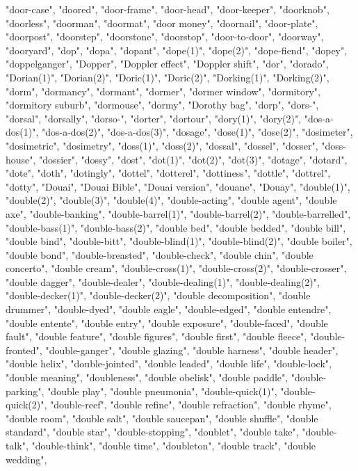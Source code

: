 "door-case",
"doored",
"door-frame",
"door-head",
"door-keeper",
"doorknob",
"doorless",
"doorman",
"doormat",
"door money",
"doornail",
"door-plate",
"doorpost",
"doorstep",
"doorstone",
"doorstop",
"door-to-door",
"doorway",
"dooryard",
"dop",
"dopa",
"dopant",
"dope(1)",
"dope(2)",
"dope-fiend",
"dopey",
"doppelganger",
"Dopper",
"Doppler effect",
"Doppler shift",
"dor",
"dorado",
"Dorian(1)",
"Dorian(2)",
"Doric(1)",
"Doric(2)",
"Dorking(1)",
"Dorking(2)",
"dorm",
"dormancy",
"dormant",
"dormer",
"dormer window",
"dormitory",
"dormitory suburb",
"dormouse",
"dormy",
"Dorothy bag",
"dorp",
"dors-",
"dorsal",
"dorsally",
"dorso-",
"dorter",
"dortour",
"dory(1)",
"dory(2)",
"dos-a-dos(1)",
"dos-a-dos(2)",
"dos-a-dos(3)",
"dosage",
"dose(1)",
"dose(2)",
"dosimeter",
"dosimetric",
"dosimetry",
"doss(1)",
"doss(2)",
"dossal",
"dossel",
"dosser",
"doss-house",
"dossier",
"dossy",
"dost",
"dot(1)",
"dot(2)",
"dot(3)",
"dotage",
"dotard",
"dote",
"doth",
"dotingly",
"dottel",
"dotterel",
"dottiness",
"dottle",
"dottrel",
"dotty",
"Douai",
"Douai Bible",
"Douai version",
"douane",
"Douay",
"double(1)",
"double(2)",
"double(3)",
"double(4)",
"double-acting",
"double agent",
"double axe",
"double-banking",
"double-barrel(1)",
"double-barrel(2)",
"double-barrelled",
"double-bass(1)",
"double-bass(2)",
"double bed",
"double bedded",
"double bill",
"double bind",
"double-bitt",
"double-blind(1)",
"double-blind(2)",
"double boiler",
"double bond",
"double-breasted",
"double-check",
"double chin",
"double concerto",
"double cream",
"double-cross(1)",
"double-cross(2)",
"double-crosser",
"double dagger",
"double-dealer",
"double-dealing(1)",
"double-dealing(2)",
"double-decker(1)",
"double-decker(2)",
"double decomposition",
"double drummer",
"double-dyed",
"double eagle",
"double-edged",
"double entendre",
"double entente",
"double entry",
"double exposure",
"double-faced",
"double fault",
"double feature",
"double figures",
"double first",
"double fleece",
"double-fronted",
"double-ganger",
"double glazing",
"double harness",
"double header",
"double helix",
"double-jointed",
"double leaded",
"double life",
"double-lock",
"double meaning",
"doubleness",
"double obelisk",
"double paddle",
"double-parking",
"double play",
"double pneumonia",
"double-quick(1)",
"double-quick(2)",
"double-reef",
"double refine",
"double refraction",
"double rhyme",
"double room",
"double salt",
"double saucepan",
"double shuffle",
"double standard",
"double star",
"double-stopping",
"doublet",
"double take",
"double-talk",
"double-think",
"double time",
"doubleton",
"double track",
"double wedding",
